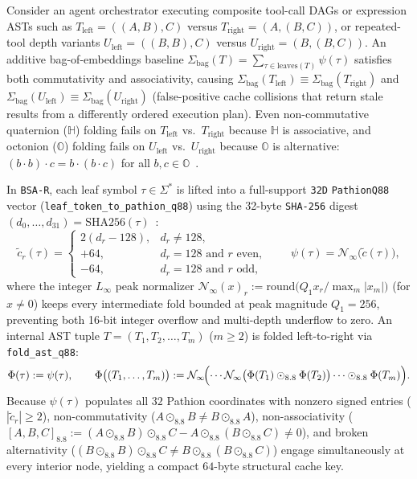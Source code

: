 \documentclass[11pt]{article}
\theoremstyle{plain}
\theoremstyle{definition}
\begin{document}
Consider an agent orchestrator executing composite tool-call DAGs or expression ASTs such as $T_{\mathrm{left}} = ((A, B), C)$ versus $T_{\mathrm{right}} = (A, (B, C))$, or repeated-tool depth variants $U_{\mathrm{left}} = ((B, B), C)$ versus $U_{\mathrm{right}} = (B, (B, C))$. An additive bag-of-embeddings baseline $\Sigma_{\mathrm{bag}}(T) = \sum_{\tau \in \mathrm{leaves}(T)} \psi(\tau)$ satisfies both commutativity and associativity, causing $\Sigma_{\mathrm{bag}}(T_{\mathrm{left}}) \equiv \Sigma_{\mathrm{bag}}(T_{\mathrm{right}})$ and $\Sigma_{\mathrm{bag}}(U_{\mathrm{left}}) \equiv \Sigma_{\mathrm{bag}}(U_{\mathrm{right}})$ (false-positive cache collisions that return stale results from a differently ordered execution plan). Even non-commutative quaternion ($\mathbb{H}$) folding fails on $T_{\mathrm{left}}$ vs.\ $T_{\mathrm{right}}$ because $\mathbb{H}$ is associative, and octonion ($\mathbb{O}$) folding fails on $U_{\mathrm{left}}$ vs.\ $U_{\mathrm{right}}$ because $\mathbb{O}$ is alternative: $(b \cdot b) \cdot c = b \cdot (b \cdot c)$ for all $b, c \in \mathbb{O}$~\cite{schafer1954}.

In \texttt{BSA-R}, each leaf symbol $\tau \in \Sigma^*$ is lifted into a full-support \texttt{32D} \texttt{PathionQ88} vector (\texttt{leaf\_token\_to\_pathion\_q88}) using the 32-byte \texttt{SHA-256} digest $(d_0, \dots, d_{31}) = \mathrm{SHA256}(\tau)$~\cite{merkle1988digital}:
\begin{equation}\label{eq:leaf_lift}
  \tilde{c}_r(\tau) = \begin{cases}
    2(d_r - 128), & d_r \neq 128, \\
    +64, & d_r = 128 \text{ and } r \text{ even}, \\
    -64, & d_r = 128 \text{ and } r \text{ odd},
  \end{cases}
  \qquad \psi(\tau) = \mathcal{N}_\infty\bigl(\tilde{c}(\tau)\bigr),
\end{equation}
where the integer $L_\infty$ peak normalizer $\mathcal{N}_\infty(x)_r := \mathrm{round}\bigl(Q_1 x_r / \max_m |x_m|\bigr)$ (for $x \neq 0$) keeps every intermediate fold bounded at peak magnitude $Q_1 = 256$, preventing both 16-bit integer overflow and multi-depth underflow to zero. An internal AST tuple $T = (T_1, T_2, \dots, T_m)$ ($m \ge 2$) is folded left-to-right via \texttt{fold\_ast\_q88}:
\begin{equation}\label{eq:ast_fold}
  \Phi(\tau) := \psi(\tau), \qquad \Phi\bigl((T_1, \dots, T_m)\bigr) := \mathcal{N}_\infty\!\Bigl(\cdots \mathcal{N}_\infty\bigl(\Phi(T_1) \odot_{8.8} \Phi(T_2)\bigr) \cdots \odot_{8.8} \Phi(T_m)\Bigr).
\end{equation}
Because $\psi(\tau)$ populates all $32$ Pathion coordinates with nonzero signed entries ($|\tilde{c}_r| \ge 2$), non-commutativity ($A \odot_{8.8} B \neq B \odot_{8.8} A$), non-associativity ($[A, B, C]_{8.8} := (A \odot_{8.8} B) \odot_{8.8} C - A \odot_{8.8} (B \odot_{8.8} C) \neq 0$), and broken alternativity ($(B \odot_{8.8} B) \odot_{8.8} C \neq B \odot_{8.8} (B \odot_{8.8} C)$) engage simultaneously at every interior node, yielding a compact $64$-byte structural cache key.
\end{document}
